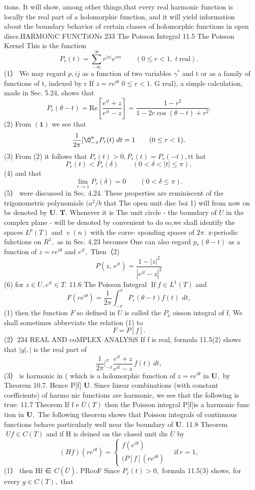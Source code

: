 tions. It will show, among other things,that every real harmonic function is locally the real part of a holomorphic function, and it will yield information about the boundary behavior of certain classes of holomorphic functions in open discs.HARMONiC FUNCTiONs 233 The Poisson Integral 11.5 The Poisson Kernel This is the function $$ P_{r}(t)=\sum_{-\infty}^{\infty}r^{|n|}e^{i m}\qquad(0\leq r<1,\;t\ \mathrm{real}). $$ (1） We may regard $\scriptstyle{p,i j}$ as a function of two variables $\textstyle\gamma^{*}$ and t or as a family of functions of t, indexed by r If $z=r e^{i\theta}$ $0\leq r<1.$ G real), a simple calculation, made in Sec. 5.24, shows that $$ P_{r}(\theta-t)=\mathrm{Re}\left[{\frac{e^{i t}+z}{e^{i t}-z}}\right]={\frac{1-r^{2}}{1-2r\cos\left(\theta-t\right)+r^{2}}}. $$ (2) From $\mathbf{(1)}$ we see that $$ \frac{1}{2\pi} [\O_{-\pi}^{\pi}P_{r}(t)\;d t=1\qquad(0\leq r<1). $$ (3) From (2) it follows that $P_{r}(t)>0,P_{r}(t)=P_{r}(-t),\mathrm{t}\mathrm{t}$ hat $$ P_{r}(t)<P_{r}(\delta)\qquad(0<\delta<|t|\leq\pi), $$ (4) and that $$ \operatorname*{lim}_{r\to1}P_{r}(\delta)=0\qquad(0<\delta\le\pi). $$ (5） were discussed in Sec. 4.24. These properties are reminiscent of the trigonometric polynomials $\scriptstyle(a^{2}/b$ that The open unit disc $\mathrm{boi}$ 1) will from now on be denoted by ${\boldsymbol{U}}.$ ${\boldsymbol{T}}.$ Whenever it is The unit circle - the boundary of $U$ in the complex plane - will be denoted by convenient to do so,we shall identify the spaces $L^{p}(T)$ and $\operatorname{c}(n)$ with the corre- sponding spaces of $2\pi.$ z-periodic fuhctions on $R^{1},$ as in Sec. 4.23 becomes One can also regard $p_{*}(\theta-t)$ as a function of $z=r e^{i\theta}$ and $e^{i t},$ Then（2) $$ P(z,\,e^{i t})=\frac{1-|z|^{2}}{|e^{i t}-z|^{2}} $$ (6) for $z\in U,e^{i t}\in T.$ 11.6 The Poisson Integral $\operatorname{If}f\in L^{1}(T)$ and $$ F(r e^{i\theta})=\frac{1}{2\pi}\int_{-\pi}^{\pi}P_{r}(\theta-t)f(t)\,\,d t, $$ (1) then the function ${\mathbf{}}F$ so defined in $U$ is called the $P_{\bar{\nu}}$ oisson integral of f. We shall sometimes abbreviate the relation (1) to $$ F=P[f]. $$ (2）234 REAL AND coMPLEX ANALYSiS If f is real, formula 11.5(2) shows that $\scriptstyle{|y|,|}$ is the real part of $$ {\frac{1}{2\pi}} |_{-\pi}^{\pi}{\frac{e^{i t}+z}{e^{i t}-z}}\,f(t)\,d t, $$ (3） is harmonic in ( which is a holomorphic function of $z=r e^{i\theta}$ in ${\boldsymbol{U}},$ by Theorem 10.7. Hence P[f] ${\boldsymbol{U}}.$ Since linear combinations (with constant coefficients) of harmo nic functions are harmonic, we see that the following is true: 11.7 Theorem If f e $\scriptstyle U(T)$ then the Poisson integral P[f]is a harmonic func tion in ${\boldsymbol{U}},$ The following theorem shows that Poisson integrals of continuous functions behave particularly well near the boundary of ${\boldsymbol{U}}.$ 11.8 Theorem $\;U f\in C(T)$ and if H is deined on the closed unit dis $\bar{U}$ by $$ (H f)(r e^{i\theta})=\left\{\!\!\begin{array}{c}{{f(e^{i\theta})\!}}\\ {{(P[f](r e^{i\theta})\!}}\end{array}\right.\quad\mathrm{if}\ r=1, $$ (1） then Hf ∈ $C({\bar{U}}).$ PRooF Since $P_{r}(t)>0,$ formula 11.5(3) shows, for every $g\in C(T),$ that $$ 